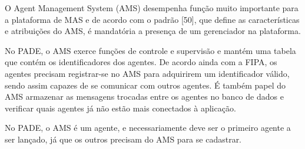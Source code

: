 \documentclass[journal]{IEEEtran}
\begin{document}
O Agent Management System (AMS) desempenha função muito importante para a plataforma de MAS e de acordo com o padrão [50], que define as características e atribuições do AMS, é mandatória a presença de um gerenciador na plataforma.

No PADE, o AMS exerce funções de controle e supervisão e mantém uma tabela que contém os identificadores dos agentes. De acordo ainda com a FIPA, os agentes precisam registrar-se no AMS para adquirirem um identificador válido, sendo assim capazes de se comunicar com outros agentes. É também papel do AMS armazenar as mensagens trocadas entre os agentes no banco de dados e verificar quais agentes já não estão mais conectados à aplicação.

No PADE, o AMS é um agente, e necessariamente deve ser o primeiro agente a ser lançado, já que os outros precisam do AMS para se cadastrar. 





\end{document}
